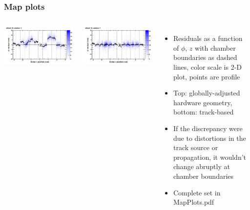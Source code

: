 \documentclass[compress]{beamer}
\begin{document}
\begin{frame}
\frametitle{Map plots}

\begin{columns}
\includegraphics[width=\linewidth]{NOV4_mapplots_HW/DTvsphi_st1whC_x.png}

\includegraphics[width=\linewidth]{NOV4_mapplots/DTvsphi_st1whC_x.png}

\begin{itemize}
\item Residuals as a function of $\phi$, $z$ with chamber boundaries as dashed lines, color scale is 2-D plot, points are profile
\item Top: globally-adjusted hardware geometry, bottom: track-based
\item If the discrepancy were due to distortions in the track source or propagation, it wouldn't change abruptly at chamber boundaries
\item Complete set in MapPlots.pdf
\end{itemize}
\end{columns}
\end{frame}
\end{document}
